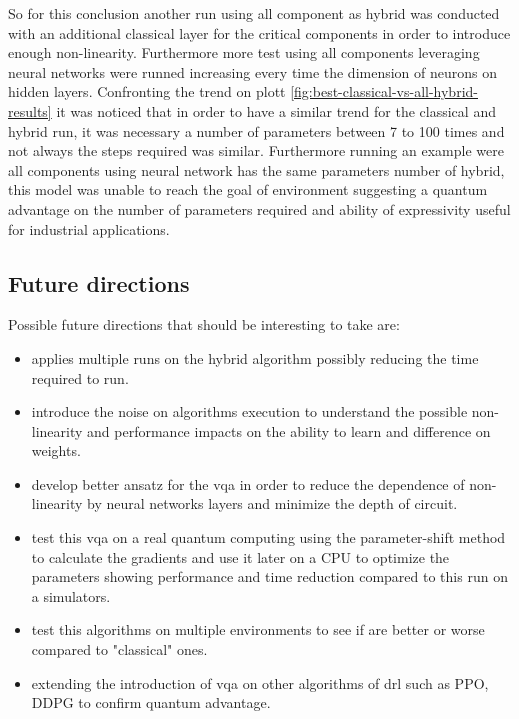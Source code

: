 So for this conclusion another run using all component as hybrid was conducted with an additional classical layer for the critical components in order to introduce enough non-linearity. Furthermore more test using all components leveraging neural networks were runned increasing every time the dimension of neurons on hidden layers.
Confronting the trend on plott \ref{fig:best-classical-vs-all-hybrid-results} it was noticed that in order to have a similar trend for the classical and hybrid run, it was necessary a number of parameters between 7 to 100 times and not always the steps required was similar. 
Furthermore running an example were all components using neural network has the same parameters number of hybrid, this model was unable to reach the goal of environment suggesting a quantum advantage on the number of parameters required and ability of expressivity useful for industrial applications.
\subsection{Future directions}
Possible future directions that should be interesting to take are:
 \begin{itemize}
	\item applies multiple runs on the hybrid algorithm possibly reducing the time required to run.
	\item introduce the noise on algorithms execution to understand the possible non-linearity and performance impacts on the ability to learn and difference on weights.
	\item develop better ansatz for the \acrshort{vqa} in order to reduce the dependence of non-linearity by neural networks layers and minimize the depth of circuit.
	\item test this \acrshort{vqa} on a real quantum computing using the parameter-shift method to calculate the gradients and use it later on a CPU to optimize the parameters showing performance and time reduction compared to this run on a simulators.
	\item test this algorithms on multiple environments to see if are better or worse compared to "classical" ones.
	\item extending the introduction of \acrshort{vqa} on other algorithms of \acrshort{drl} such as PPO, DDPG to confirm quantum advantage.
\end{itemize}